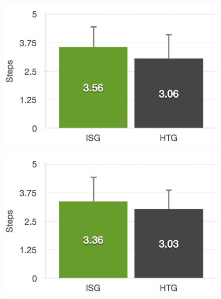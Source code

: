 \begin{figure}[htb]
\begin{minipage}[t]{0.40\linewidth}
		\label{fig:6_4_standRightGroupEffect}
	\end{minipage}
	\hfill
	\begin{minipage}[t]{0.40\linewidth}
		\centering
		\includegraphics[width=1\linewidth]{Pictures/6_4_DIA_StepsLeftGroupEffect}
		\label{fig:6_4_stepsLeftGroupEffect}
	\end{minipage}
	\hfill
	\begin{minipage}[t]{0.40\linewidth}
		\centering
		\includegraphics[width=1\linewidth]{Pictures/6_4_DIA_StepsRightGroupEffect}
		\label{fig:6_4_stepsRightGroupEffect}
	\end{minipage}
	\hfill
	\begin{minipage}[t]{0.40\linewidth}
		\centering

\end{minipage}
\end{figure}
